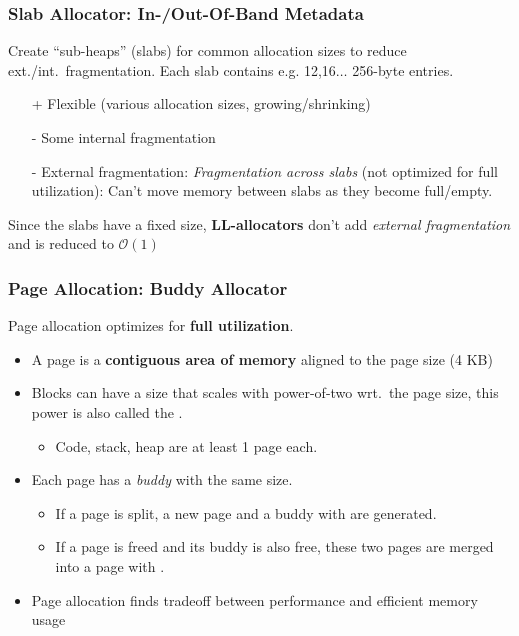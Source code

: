 \subsubsection{Slab Allocator: In-/Out-Of-Band Metadata}
Create ``sub-heaps'' (slabs) for common allocation sizes to reduce ext./int.\ fragmentation. Each slab contains e.g. 12,16$\dots$ 256-byte entries.

\begin{itemize}
    \item[+] Flexible (various allocation sizes, growing/shrinking)
    \item[-] Some internal fragmentation
    \item[-] External fragmentation: \textit{Fragmentation across slabs} (not optimized for full utilization): Can't move memory between slabs as they become full/empty.
\end{itemize}

\newpar{}

Since the slabs have a fixed size, \textbf{LL-allocators} don't add \textit{external fragmentation} and  is reduced to $\mathcal{O}(1)$

\subsubsection{Page Allocation: Buddy Allocator}
Page allocation optimizes for \textbf{full utilization}.
\begin{itemize}
    \item A page is a \textbf{contiguous area of memory} aligned to the page size (4 KB)
    \item Blocks can have a size that scales with power-of-two wrt.\ the page size, this power is also called the .
          \begin{itemize}
              \item Code, stack, heap are at least 1 page each.
          \end{itemize}
    \item Each page has a \textit{buddy} with the same size.
          \begin{itemize}
              \item If a page is split, a new page and a buddy with \newline {} are generated.
              \item If a page is freed and its buddy is also free, these two pages are merged into a page with .
          \end{itemize}
    \item Page allocation finds tradeoff between performance and efficient memory usage
\end{itemize}

